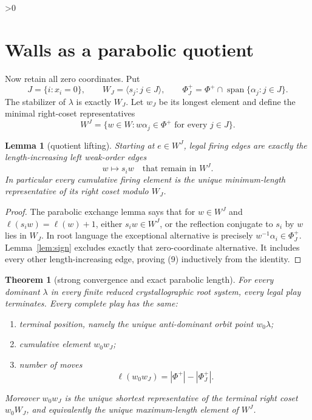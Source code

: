 \documentclass[10pt]{article}
\providecommand{\CRevisionRound}{2}
\newtheorem{theorem}{Theorem}
\newtheorem{lemma}{Lemma}
\newcommand{\ellW}{\ell}
\begin{document}
\ifnum\CRevisionRound>0
\section{Walls as a parabolic quotient}

Now retain all zero coordinates.  Put
\[
 J=\{i:x_i=0\},\qquad W_J=\langle s_j:j\in J\rangle,
 \qquad \Phi_J^+=\Phi^+\cap\operatorname{span}\{\alpha_j:j\in J\}. \tag{7}
\]
The stabilizer of $\lambda$ is exactly $W_J$.  Let $w_J$ be its longest
element and define the minimal right-coset representatives
\begin{equation}
 W^J=\{w\in W:w\alpha_j\in\Phi^+\text{ for every }j\in J\}. \tag{8}
\end{equation}

\begin{lemma}[quotient lifting]\label{lem:quotient}
Starting at $e\in W^J$, legal firing edges are exactly the
length-increasing left weak-order edges
\[
 w\longmapsto s_iw\quad\text{that remain in }W^J.         \tag{9}
\]
In particular every cumulative firing element is the unique minimum-length
representative of its right coset modulo $W_J$.
\end{lemma}

\begin{proof}
The parabolic exchange lemma says that for $w\in W^J$ and
$\ellW(s_iw)=\ellW(w)+1$, either $s_iw\in W^J$, or the reflection conjugate
to $s_i$ by $w$ lies in $W_J$.  In root language the exceptional alternative
is precisely $w^{-1}\alpha_i\in\Phi_J^+$.  Lemma~\ref{lem:sign} excludes
exactly that zero-coordinate alternative.  It includes every other
length-increasing edge, proving (9) inductively from the identity.
\end{proof}

\begin{theorem}[strong convergence and exact parabolic length]
\label{thm:main}
For every dominant $\lambda$ in every finite reduced crystallographic root
system, every legal play terminates.  Every complete play has the same:
\begin{enumerate}
\item terminal position, namely the unique anti-dominant orbit point
      $w_0\lambda$;
\item cumulative element $w_0w_J$;
\item number of moves
\begin{equation}
 \ellW(w_0w_J)=|\Phi^+|-|\Phi_J^+|.                       \tag{10}
\end{equation}
\end{enumerate}
Moreover $w_0w_J$ is the unique shortest representative of the terminal
right coset $w_0W_J$, and equivalently the unique maximum-length element of
$W^J$.
\end{theorem}
\end{document}
